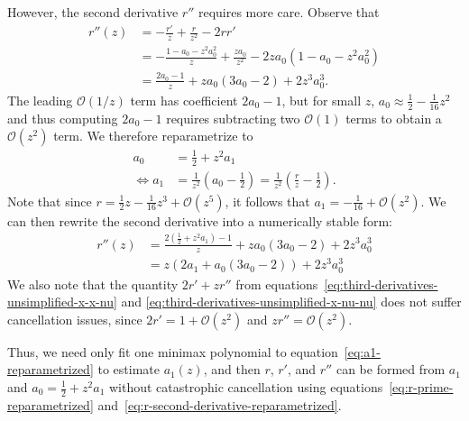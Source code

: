 \documentclass{article}
\begin{document}
However, the second derivative $r''$ requires more care.
Observe that
%
\begin{align}
  r''(z) & = -\frac{r'}{z} + \frac{r}{z^2} - 2 r r'                                             \\
         & = -\frac{1 - a_0 - z^2 a_0^2}{z} + \frac{z a_0}{z^2} -  2 z a_0(1 - a_0 - z^2 a_0^2) \\
         & = \frac{2 a_0 - 1}{z} + z a_0 (3 a_0 - 2) + 2 z^3 a_0^3.
\end{align}
%
The leading $\mathcal{O}(1/z)$ term has coefficient $2a_0 - 1$, but for small $z$, $a_0 \approx \frac{1}{2} - \frac{1}{16}z^2$ and thus computing $2a_0 - 1$ requires subtracting two $\mathcal{O}(1)$ terms to obtain a $\mathcal{O}(z^2)$ term.
We therefore reparametrize to
%
\begin{align}
  a_0                 & = \frac{1}{2} + z^2 a_1 \label{eq:a0-reparametrized}                                                          \\
  \Leftrightarrow a_1 & = \frac{1}{z^2} (a_0 - \frac{1}{2}) = \frac{1}{z^2} (\frac{r}{z} - \frac{1}{2}). \label{eq:a1-reparametrized}
\end{align}
%
Note that since $r = \frac{1}{2}z - \frac{1}{16}z^3 + \mathcal{O}(z^5)$, it follows that $a_1 = -\frac{1}{16} + \mathcal{O}(z^2)$.
We can then rewrite the second derivative into a numerically stable form:
%
\begin{align}
  r''(z) & = \frac{2(\frac{1}{2} + z^2 a_1)-1}{z} + z a_0 (3 a_0 - 2) + 2 z^3 a_0^3                 \\
         & = z (2a_1 + a_0 (3 a_0 - 2)) + 2 z^3 a_0^3 \label{eq:r-second-derivative-reparametrized}
\end{align}
%
We also note that the quantity $2r' + z r''$ from equations~\eqref{eq:third-derivatives-unsimplified-x-x-nu} and
\eqref{eq:third-derivatives-unsimplified-x-nu-nu} does not suffer cancellation issues, since $2r' = 1 + \mathcal{O}(z^2)$ and $z r'' = \mathcal{O}(z^2)$.

Thus, we need only fit one minimax polynomial to equation~\eqref{eq:a1-reparametrized} to estimate $a_1(z)$, and then $r$, $r'$, and $r''$ can be formed from $a_1$ and $a_0 = \frac{1}{2} + z^2 a_1$ without catastrophic cancellation using equations~\eqref{eq:r-prime-reparametrized} and~\eqref{eq:r-second-derivative-reparametrized}.
\end{document}
